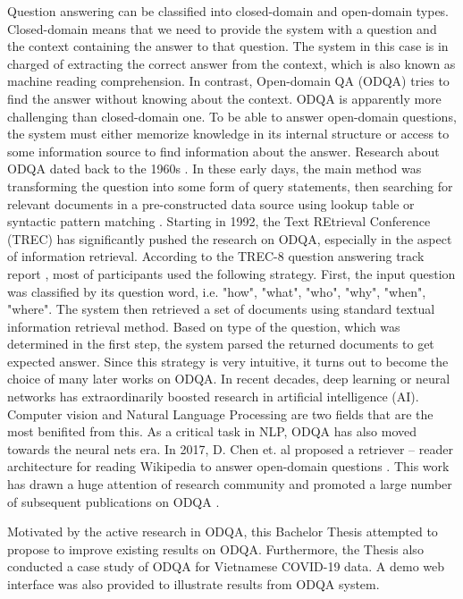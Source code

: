 \documentclass[12pt, sort&compress]{report}
\begin{document}
\par Question answering can be classified into closed-domain and open-domain types. Closed-domain means that we need to provide the system with a question and the context containing the answer to that question. The system in this case is in charged of extracting the correct answer from the context, which is also known as machine reading comprehension. In contrast, Open-domain QA (ODQA) tries to find the answer without knowing about the context. ODQA is apparently more challenging than closed-domain one. To be able to answer open-domain questions, the system must either memorize knowledge in its internal structure or access to some information source to find information about the answer. Research about ODQA dated back to the 1960s \cite{green1961baseball}. In these early days, the main method was transforming the question into some form of query statements, then searching for relevant documents in a pre-constructed data source using lookup table \cite{green1961baseball} or syntactic pattern matching \cite{kupiec1993murax}. Starting in 1992, the Text REtrieval Conference (TREC) has significantly pushed the research on ODQA, especially in the aspect of information retrieval. According to the TREC-8 question answering track report \cite{voorhees1999trec}, most of participants used the following strategy. First, the input question was classified by its question word, i.e. "how", "what", "who", "why", "when", "where". The system then retrieved a set of documents using standard textual information retrieval method. Based on type of the question, which was determined in the first step, the system parsed the returned documents to get expected answer. Since this strategy is very intuitive, it turns out to become the choice of many later works on ODQA. In recent decades, deep learning or neural networks has extraordinarily boosted research in artificial intelligence (AI). Computer vision and Natural Language Processing are two fields that are the most benifited from this. As a critical task in NLP, ODQA has also moved towards the neural nets era. In 2017, D. Chen et. al proposed a retriever – reader architecture for reading Wikipedia to answer open-domain questions \cite{chen2017reading}. This work has drawn a huge attention of research community and promoted a large number of subsequent publications on ODQA \cite{wang2017rtheta3,asai2019learning,lee2019latent,min2019discrete,min2019knowledge,seo2019real,wang2019multi,guu2020realm,izacard2020leveraging,karpukhin2020dense,lewis2020retrieval,mao2020generation,min2020ambigqa,roberts2020much,xiong2020progressively,mao2021reader}. 
\par Motivated by the active research in ODQA, this Bachelor Thesis attempted to propose to improve existing results on ODQA. Furthermore, the Thesis also conducted a case study of ODQA for Vietnamese COVID-19 data. A demo web interface was also provided to illustrate results from ODQA system.
\end{document}
